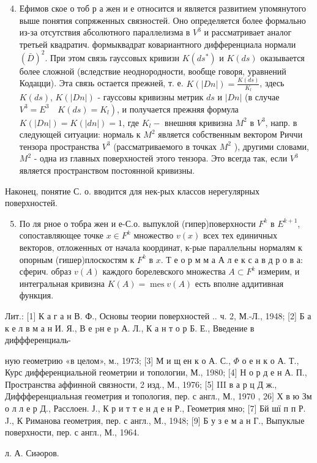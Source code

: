 \documentclass[10pt]{article}
\begin{document}
\begin{enumerate}

  \setcounter{enumi}{3}

  \item Ефимов ское о тоб р а жен и е относится и является развитием упомянутого выше понятия сопряженных связностей. Оно определяется более формально из-за отсутствия абсолютного параллелизма в $V^{3}$ и рассматривает аналог третьей квадратич. формыквадрат ковариантного дифференциала нормали $(\bar{D})^{2}$. При этом связь гауссовых кривизн $K\left(d s^{*}\right)$ и $K(d s)$ оказывается более сложной (вследствие неоднородности, вообще говоря, уравнений Кодацци). Эта связь остается прежней, т. е. $K(|D n|)=\frac{K(d s)}{K_{l}}$, здесь $K(d s)$, $K(|D n|)$ - гауссовы кривизны метрик $d s$ и $|D n|$ (в случае $\left.V^{3}=E^{3} \quad K(d s)=K_{l}\right)$, и получается прежняя формула $K(|D n|)=K(|d n|)=1$, где $K_{l}-$ внешняя кривизна $M^{2}$ в $V^{3}$, напр. в следующей ситуации: нормаль к $M^{2}$ является собственным вектором Риччи тензора пространства $V^{3}$ (рассматриваемого в точках $M^{2}$ ), другими словами, $M^{2}$ - одна из главных поверхностей этого тензора. Это всегда так, если $V^{3}$ является пространством постоянной кривизны.

\end{enumerate}



Наконец, понятие С. о. вводится для нек-рых классов нерегулярных поверхностей.



\begin{enumerate}

  \setcounter{enumi}{4}

  \item По ля рное о тобра жен и е-С.о. выпуклой (гипер)поверхности $F^{k}$ в $E^{k+1}$, сопоставляющее точке $x \in F^{k}$ множество $v(x)$ всех тех единичных векторов, отложенных от начала координат, к-рые параллельны нормалям к опорным (гишер)плоскостям к $F^{k}$ в $x$. Т е о р м м а А л е к с а в д р о в а: сферич. образ $v(A)$ каждого борелевского множества $A \subset F^{k}$ измерим, и интегральная кривизна $K(A)=\operatorname{mes} v(A)$ есть вполне аддитивная функция.

\end{enumerate}



Лит.: [1] К а г а н В. Ф., Основы теории поверхностей .. ч. 2, М.-Л., 1948; [2] Б а к е л в м а н И. Я., В е pн е p А. Л., К а н т о р Б. Е., Введение в диффференциаль-

ную геометрию «в целом», м., 1973; [3] М и щ ен к о А. С., $\Phi$ о е н к о А. Т., Курс дифференциальной геометрии и топологии, М., 1980; [4] Н о р д е н А. П., Пространства аффинной связности, 2 изд., М., 1976; [5] III в а р ц Д ж., Диффференциальная геометрия и топология, пер. с англ., М., 1970 , 26$]$ Х в ю Зм о л л е р Д., Расслоен. Ј., К р и т т е н д е н Р., Геометрия мно; [7] Бй шї п п Р. J., К Риманова геометрия, пер. с англ., М., 1948; [9] Б у з е м а н Г., Выпуклые поверхности, пер. с англ., М., 1964.



л. А. Сиәоров.
\end{document}
